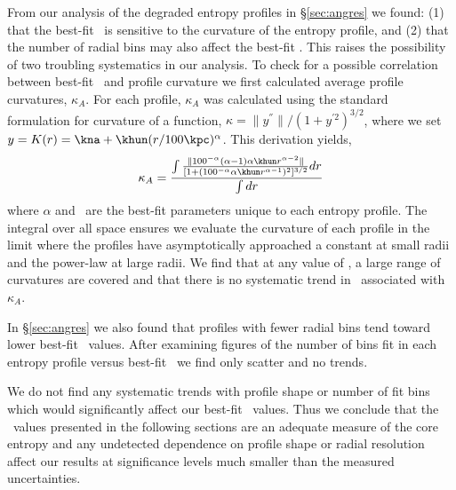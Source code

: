 \documentclass[apj]{emulateapj}
\begin{document}
From our analysis of the degraded entropy profiles in
\S\ref{sec:angres} we found: (1) that the best-fit \kna\ is sensitive
to the curvature of the entropy profile, and (2) that the number of
radial bins may also affect the best-fit \kna. This raises the
possibility of two troubling systematics in our analysis. To check for
a possible correlation between best-fit \kna\ and profile curvature we
first calculated average profile curvatures, $\kappa_A$. For each
profile, $\kappa_A$ was calculated using the standard formulation for
curvature of a function, $\kappa = \|y^{''}\|/(1+y^{'2})^{3/2}$, where
we set $y = K(r) = \kna+\khun(r/100\kpc)^{\alpha}$. This derivation
yields,
\begin{equation}
\kappa_A = \frac{\int\frac{\| 100^{-\alpha} (\alpha-1) \alpha \khun
  r^{\alpha-2}\|}{[1+(100^{-\alpha} \alpha \khun
    r^{\alpha-1})^2]^{3/2}} dr}{\int dr}
\end{equation}
where $\alpha$ and \khun\ are the best-fit parameters unique to each
entropy profile. The integral over all space ensures we evaluate the
curvature of each profile in the limit where the profiles have
asymptotically approached a constant at small radii and the power-law
at large radii. We find that at any value of \kna, a large range of
curvatures are covered and that there is no systematic trend in \kna\
associated with $\kappa_A$.

In \S\ref{sec:angres} we also found that profiles with fewer radial
bins tend toward lower best-fit \kna\ values. After examining figures
of the number of bins fit in each entropy profile versus best-fit
\kna\ we find only scatter and no trends. 

We do not find any systematic trends with profile shape or number of
fit bins which would significantly affect our best-fit \kna\
values. Thus we conclude that the \kna\ values presented in the
following sections are an adequate measure of the core entropy and any
undetected dependence on profile shape or radial resolution affect our
results at significance levels much smaller than the measured
uncertainties.
\end{document}
